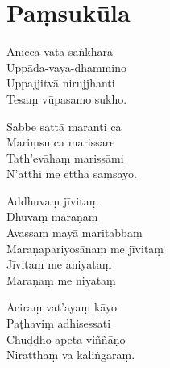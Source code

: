 
\clearpage

\section{Paṃsukūla}



Aniccā vata saṅkhārā\\
Uppāda-vaya-dhammino\\
Uppajjitvā nirujjhanti\\
Tesaṃ vūpasamo sukho. 

Sabbe sattā maranti ca\\
Mariṃsu ca marissare\\
Tath'evāhaṃ marissāmi\\
N'atthi me ettha saṃsayo.


Addhuvaṃ jīvitaṃ\\
Dhuvaṃ maraṇaṃ\\
Avassaṃ mayā maritabbaṃ\\
Maraṇapariyosānaṃ me jīvitaṃ\\
Jīvitaṃ me aniyataṃ\\
Maraṇaṃ me niyataṃ 



Aciraṃ vat'ayaṃ kāyo\\
Paṭhaviṃ adhisessati\\
Chuḍḍho apeta-viññāṇo\\
Niratthaṃ va kaliṅgaraṃ. 

